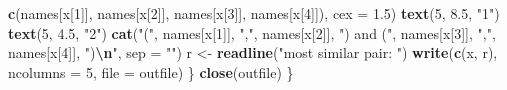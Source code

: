 \documentclass[
  12pt,
]{article}
\newenvironment{Shaded}{\begin{snugshade}}{\end{snugshade}}
\newcommand{\AttributeTok}[1]{\textcolor[rgb]{0.13,0.29,0.53}{#1}}
\newcommand{\DecValTok}[1]{\textcolor[rgb]{0.00,0.00,0.81}{#1}}
\newcommand{\FloatTok}[1]{\textcolor[rgb]{0.00,0.00,0.81}{#1}}
\newcommand{\FunctionTok}[1]{\textcolor[rgb]{0.13,0.29,0.53}{\textbf{#1}}}
\newcommand{\NormalTok}[1]{#1}
\newcommand{\OtherTok}[1]{\textcolor[rgb]{0.56,0.35,0.01}{#1}}
\newcommand{\SpecialCharTok}[1]{\textcolor[rgb]{0.81,0.36,0.00}{\textbf{#1}}}
\newcommand{\StringTok}[1]{\textcolor[rgb]{0.31,0.60,0.02}{#1}}
\begin{document}
\begin{Shaded}
\begin{Highlighting}[]
         \FunctionTok{c}\NormalTok{(names[x[}\DecValTok{1}\NormalTok{]], names[x[}\DecValTok{2}\NormalTok{]], names[x[}\DecValTok{3}\NormalTok{]], names[x[}\DecValTok{4}\NormalTok{]]),}
         \AttributeTok{cex =} \FloatTok{1.5}\NormalTok{)}
    \FunctionTok{text}\NormalTok{(}\DecValTok{5}\NormalTok{, }\FloatTok{8.5}\NormalTok{, }\StringTok{"1"}\NormalTok{)}
    \FunctionTok{text}\NormalTok{(}\DecValTok{5}\NormalTok{, }\FloatTok{4.5}\NormalTok{, }\StringTok{"2"}\NormalTok{)}
    \FunctionTok{cat}\NormalTok{(}\StringTok{"("}\NormalTok{,}
\NormalTok{        names[x[}\DecValTok{1}\NormalTok{]],}
        \StringTok{","}\NormalTok{,}
\NormalTok{        names[x[}\DecValTok{2}\NormalTok{]],}
        \StringTok{") and ("}\NormalTok{,}
\NormalTok{        names[x[}\DecValTok{3}\NormalTok{]],}
        \StringTok{","}\NormalTok{,}
\NormalTok{        names[x[}\DecValTok{4}\NormalTok{]],}
        \StringTok{")}\SpecialCharTok{\textbackslash{}n}\StringTok{"}\NormalTok{,}
        \AttributeTok{sep =} \StringTok{""}\NormalTok{)}
\NormalTok{    r }\OtherTok{\textless{}{-}} \FunctionTok{readline}\NormalTok{(}\StringTok{"most similar pair: "}\NormalTok{)}
    \FunctionTok{write}\NormalTok{(}\FunctionTok{c}\NormalTok{(x, r), }\AttributeTok{ncolumns =} \DecValTok{5}\NormalTok{, }\AttributeTok{file =}\NormalTok{ outfile)}
\NormalTok{  \}}
  \FunctionTok{close}\NormalTok{(outfile)}
\NormalTok{\}}


\end{Highlighting}
\end{Shaded}
\end{document}
